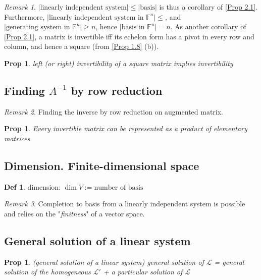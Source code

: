\documentclass[hidelinks]{article}
\theoremstyle{definition}
\newtheorem*{defin}{Def}
\theoremstyle{plain}
\newtheorem{proposition}[theorem]{Prop}
\theoremstyle{remark}
\newtheorem*{remark}{Remark}
\begin{document}
\begin{remark}
$|\textrm{linearly independent system}|\leq|\textrm{basis}|$ is thus a corollary of \autoref{Prop 2.1}. Furthermore, $\textrm{|linearly independent system in } \mathbb{F}^n|\leq $, and $\textrm{|generating system in } \mathbb{F}^n|\geq n$, hence $\textrm{|basis in } \mathbb{F}^n|=n$. As another corollary of \autoref{Prop 2.1}, a matrix is invertible iff its echelon form has a pivot in every row and column, and hence a square (from \autoref{Prop 1.8} (b)).
\end{remark}

\begin{proposition}
left (or right) invertibility  of a square matrix implies invertibility
\end{proposition}

\subsection{Finding $A^{-1}$ by row reduction}

\begin{remark}
Finding the inverse by row reduction on augmented matrix.
\end{remark}

\begin{proposition}
Every invertible matrix can be represented as a product of elementary matrices
\end{proposition}

\subsection{Dimension. Finite-dimensional space}

\begin{defin}
dimension: $\dim V:=\textrm{number of basis}$
\end{defin}

\begin{remark}
Completion to basis from a linearly independent system is possible and relies on the "\emph{finitness}" of a vector space.
\end{remark}

\subsection{General solution of a linear system}

\begin{proposition} (general solution of a linear system) \newline
general solution of $\mathscr{L}$ = general solution of the homogeneous $\mathscr{L}'$ + a particular solution of $\mathscr{L}$
\end{proposition}
\end{document}
